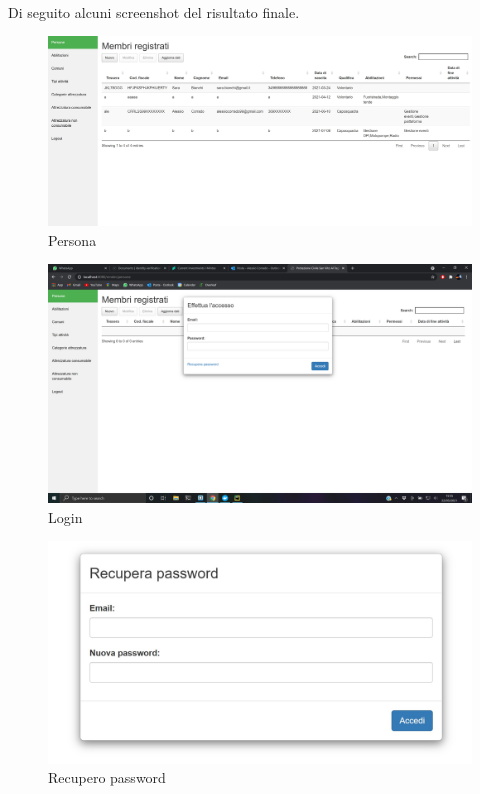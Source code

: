 \documentclass[12pt,a4paper,twoside,english,italian]{book}
\begin{document}
\paragraph{} Di seguito alcuni screenshot del risultato finale. 

\begin{figure}[H]
    \centering
    \includegraphics[width=1\textwidth]{img/persona.jpg}
    \caption{Persona}
\end{figure}

\begin{figure}[H]
    \centering
    \includegraphics[width=1\textwidth]{img/login.png}
    \caption{Login}
\end{figure}

\begin{figure}[H]
    \centering
    \includegraphics[width=1\textwidth]{img/recupero_screen.jpg}
    \caption{Recupero password}
\end{figure}
\end{document}
